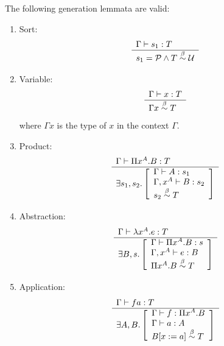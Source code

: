 \begin{theorem}
    \label{GenerationLemmata}
    The following generation lemmata are valid:
    \begin{enumerate}
    \item Sort:
        $$
        \begin{array}{l} 
            \Gamma \vdash s_1 : T
         \\ \hline 
            s_1 = {\cal P} \land T \stackrel{\beta}{\sim} {\cal U}
        \end{array}
        $$

    \item Variable:
        $$
        \begin{array}{l} 
            \Gamma \vdash x : T
         \\ \hline 
            \Gamma x \stackrel{\beta}{\sim} T
        \end{array}
        $$
        where $\Gamma x$ is the type of $x$ in the context $\Gamma$.

    \item Product:
        $$
        \begin{array}{l} 
            \Gamma \vdash \Pi x^A.B : T
         \\ \hline 
            \exists s_1, s_2.
            \left[
            \begin{array}{l}
                \Gamma \vdash A: s_1
                \\
                \Gamma, x^A \vdash B: s_2
                \\
                s_2 \stackrel{\beta}{\sim} T
            \end{array}
            \right]
        \end{array}
        $$

    \item Abstraction:
        $$
        \begin{array}{l} 
            \Gamma \vdash \lambda x^A. e : T
         \\ \hline 
            \exists B, s.
            \left[
            \begin{array}{l}
                \Gamma \vdash \Pi x^A. B: s
                \\
                \Gamma, x^A \vdash e: B
                \\
                \Pi x^A. B  \stackrel{\beta}{\sim} T
            \end{array}
            \right]
        \end{array}
        $$

    \item Application:
        $$
        \begin{array}{l} 
            \Gamma \vdash f a: T
         \\ \hline 
            \exists A, B.
            \left[
            \begin{array}{l}
                \Gamma \vdash f : \Pi x^A. B
                \\
                \Gamma \vdash a : A
                \\
                B[x:=a]  \stackrel{\beta}{\sim} T
            \end{array}
            \right]
        \end{array}
        $$
    \end{enumerate}


\end{theorem}
